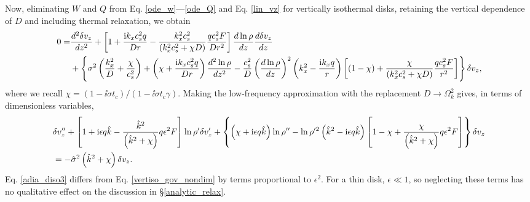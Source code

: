 Now, eliminating $W$ and $Q$ from Eq. \ref{ode_w}---\ref{ode_Q} and
Eq. \ref{lin_vz} for vertically isothermal disks, retaining the
vertical dependence of $D$ and including thermal relaxation, we
obtain 
\begin{align}
  0 =& \frac{d^2\delta v_z}{dz^2} + \left[1 + \frac{\mathrm{i} k_x c_s^2
      q}{Dr} - \frac{k_x^2c_s^2}{\left(k_x^2c_s^2 + \chi
        D\right)}\frac{qc_s^2F}{Dr^2}\right]\frac{d\ln\rho}{dz}\frac{d\delta
    v_z}{dz} \notag\\
  &+ \left\{\sigma^2\left(\frac{k_x^2}{D} +
      \frac{\chi}{c_s^2}\right) + \left(\chi + \frac{\mathrm{i} k_x c_s^2
        q}{Dr}\right)\frac{d^2\ln\rho}{dz^2} -
    \frac{c_s^2}{D}\left(\frac{d\ln\rho}{dz}\right)^2\left(k_x^2 -
      \frac{\mathrm{i} k_x q}{r}\right)
   \left[\left(1-\chi\right) +
     \frac{\chi}{\left(k_x^2c_s^2 + \chi D\right)}\frac{qc_s^2 F}{r^2}\right] 
   \right\}\delta v_z,
\end{align}
where we recall $\chi = \left(1-\ii\sigma t_c\right)/\left(1-\ii\sigma
t_c \gamma\right)$. Making the low-frequency approximation with the
replacement $D\to \Omega_k^2$ gives, in terms of dimensionless
variables,
\begin{align}
   &\delta v_z ^{\prime\prime} + \left[1 + \mathrm{i}\epsilon q\hat{k} -
    \frac{ \hat{k}^2}{
      \left(\hat{k}^2+\chi\right)}q \epsilon^2F\right]\ln\rho^{\prime}\delta v_z^\prime +
  \left\{\left(\chi + \mathrm{i} \epsilon q
      \hat{k}\right)\ln\rho^{\prime\prime} - \ln\rho^{\prime
      2}\left(\hat{k}^2 -
      \mathrm{i}\epsilon
      q\hat{k}\right)\left[1 - \chi +
      \frac{\chi}{\left(\hat{k}^2+\chi\right)}q\epsilon^2F\right]\right\}\delta v_z \notag\\&=
  -\hat{\sigma}^2\left(\hat{k}^2+\chi\right)\delta v_z\label{adia_diso3}.
\end{align}   
Eq. \ref{adia_diso3} differs from Eq. \ref{vertiso_gov_nondim} by terms
proportional to $\epsilon^2$. For a thin disk, $\epsilon\ll1$, so
neglecting these terms has no qualitative effect on the discussion in 
\S\ref{analytic_relax}. 

